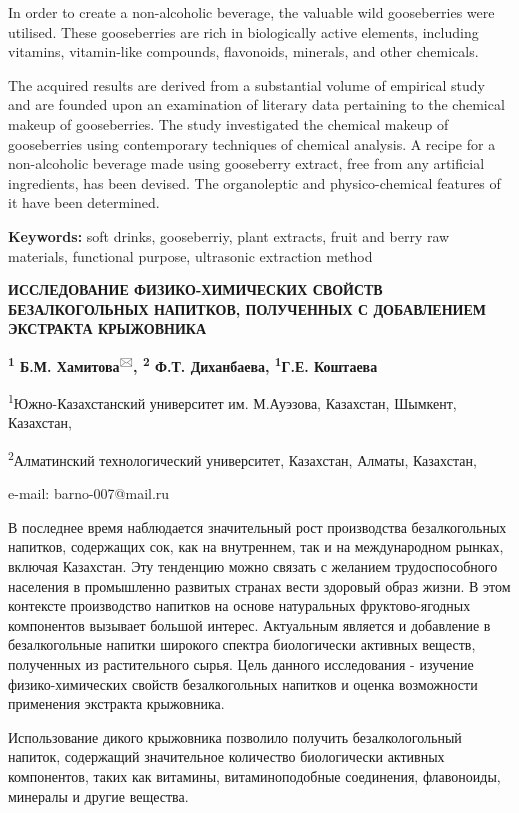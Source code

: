 In order to create a non-alcoholic beverage, the valuable wild
gooseberries were utilised. These gooseberries are rich in biologically
active elements, including vitamins, vitamin-like compounds, flavonoids,
minerals, and other chemicals.~

The acquired results are derived from a substantial volume of empirical
study and are founded upon an examination of literary data pertaining to
the chemical makeup of gooseberries. The study investigated the chemical
makeup of gooseberries using contemporary techniques of chemical
analysis. A recipe for a non-alcoholic beverage made using gooseberry
extract, free from any artificial ingredients, has been devised. The
organoleptic and physico-chemical features of it have been determined.~

{\bfseries Keywords:} soft drinks, gooseberriy, plant extracts, fruit and
berry raw materials, functional purpose, ultrasonic extraction method

{\bfseries ИССЛЕДОВАНИЕ ФИЗИКО-ХИМИЧЕСКИХ СВОЙСТВ БЕЗАЛКОГОЛЬНЫХ НАПИТКОВ,
ПОЛУЧЕННЫХ С ДОБАВЛЕНИЕМ ЭКСТРАКТА КРЫЖОВНИКА}

{\bfseries \textsuperscript{1} Б.М. Хамитова}\textsuperscript{🖂}{\bfseries ,
\textsuperscript{2} Ф.Т. Диханбаева, \textsuperscript{1}Г.Е. Коштаева}

\textsuperscript{1}Южно-Казахстанский университет им. М.Ауэзова,
Казахстан, Шымкент, Казахстан,

\textsuperscript{2}Алматинский технологический университет, Казахстан,
Алматы, Казахстан,

e-mail: barno-007@mail.ru

В последнее время наблюдается значительный рост производства
безалкогольных напитков, содержащих сок, как на внутреннем, так и на
международном рынках, включая Казахстан. Эту тенденцию можно связать с
желанием трудоспособного населения в промышленно развитых странах вести
здоровый образ жизни. В этом контексте производство напитков на основе
натуральных фруктово-ягодных компонентов вызывает большой интерес.
Актуальным является и добавление в безалкогольные напитки широкого
спектра биологически активных веществ, полученных из растительного
сырья. Цель данного исследования - изучение физико-химических свойств
безалкогольных напитков и оценка возможности применения экстракта
крыжовника.

Использование дикого крыжовника позволило получить безалкологольный
напиток, содержащий значительное количество биологически активных
компонентов, таких как витамины, витаминоподобные соединения,
флавоноиды, минералы и другие вещества.

